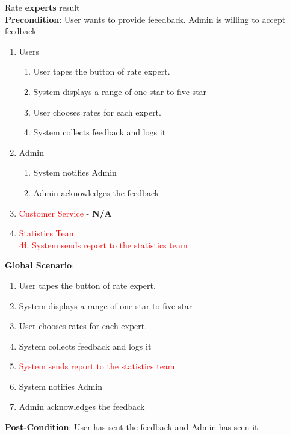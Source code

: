 \item Rate \textbf{experts} result  \\
\textbf{Precondition}: User wants to provide feeedback. Admin is willing to accept feedback
	\begin{enumerate}[{\bf VP1.}]
		\item Users
		\begin{enumerate}[{\bf 1.}]
			\item User tapes the button of rate expert.
			\item System displays a range of one star to five star
			\item User chooses rates for each expert.
			\item System collects feedback and logs it
		\end{enumerate}
		\item Admin
		\begin{enumerate}[{\bf 1.}]
			\item System notifies Admin
			\item Admin acknowledges the feedback
		\end{enumerate}
		\item \textcolor{red}{Customer Service} - \textbf{N/A}
		\item \textcolor{red}{Statistics Team}\\
			\textcolor{red}{\textbf{4i}. System sends report to the statistics team}
	\end{enumerate}
\textbf{Global Scenario}:
\begin{enumerate}[{\bf 1.}]
	\item User tapes the button of rate expert.
	\item System displays a range of one star to five star
	\item User chooses rates for each expert.
	\item System collects feedback and logs it
	\item \textcolor{red}{System sends report to the statistics team}
	\item System notifies Admin
	\item Admin acknowledges the feedback
\end{enumerate}
\textbf{Post-Condition}: User has sent the feedback and Admin has seen it.